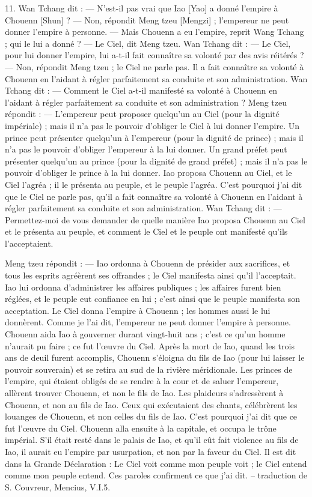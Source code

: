 \begin{singlequote}
  11.	Wan Tchang dit :
—	N’est-il pas vrai que Iao [Yao] a donné l’empire à Chouenn [Shun] ?
—	Non, répondit Meng tzeu [Mengzi] ; l’empereur ne peut donner l’empire à personne.
—	Mais Chouenn a eu l’empire, reprit Wang Tchang ; qui le lui a donné ?
—	Le Ciel, dit Meng tzeu. Wan Tchang dit :
—	Le Ciel, pour lui donner l’empire, lui a-t-il fait connaître sa volonté par des avis réitérés ?
—	Non, répondit Meng tzeu ; le Ciel ne parle pas. Il a fait connaître sa volonté à Chouenn en l’aidant à régler parfaitement sa conduite et son administration.
Wan Tchang dit :
—	Comment le Ciel a-t-il manifesté sa volonté à Chouenn en l’aidant à régler parfaitement sa conduite et son administration ?
Meng tzeu répondit :
—	L’empereur peut proposer quelqu’un au Ciel (pour la dignité impériale) ; mais il n’a pas le pouvoir d’obliger le Ciel à lui donner l’empire. Un prince peut présenter quelqu’un à l’empereur (pour la dignité de prince) ; mais il n’a pas le pouvoir d’obliger l’empereur à la lui donner. Un grand préfet peut présenter quelqu’un au prince (pour la dignité de grand préfet) ; mais il n’a pas le pouvoir d’obliger le prince à la lui donner. Iao proposa Chouenn au Ciel, et le Ciel l’agréa ; il le présenta au peuple, et le peuple l’agréa. C’est pourquoi j’ai dit que le Ciel ne parle pas, qu’il a fait connaître sa volonté à Chouenn en l’aidant à régler parfaitement sa conduite et son administration.
Wan Tchang dit :
—	Permettez-moi de vous demander de quelle manière Iao proposa Chouenn au Ciel et le présenta au peuple, et comment le Ciel et le peuple ont manifesté qu’ils l’acceptaient.
 
Meng tzeu répondit :
—	Iao ordonna à Chouenn de présider aux sacrifices, et tous les esprits agréèrent ses offrandes ; le Ciel manifesta ainsi qu’il l’acceptait. Iao lui ordonna d’administrer les affaires publiques ; les affaires furent bien réglées, et le peuple eut confiance en lui ; c’est ainsi que le peuple manifesta son acceptation. Le Ciel donna l’empire à Chouenn ; les hommes aussi le lui donnèrent. Comme je l’ai dit, l’empereur ne peut donner l’empire à personne.
Chouenn aida Iao à gouverner durant vingt-huit ans ; c’est ce qu’un homme n’aurait pu faire ; ce fut l’œuvre du Ciel. Après la mort de Iao, quand les trois ans de deuil furent accomplis, Chouenn s’éloigna du fils de Iao (pour lui laisser le pouvoir souverain) et se retira au sud de la rivière méridionale. Les princes de l’empire, qui étaient obligés de se rendre à la cour et de saluer l’empereur, allèrent trouver Chouenn, et non le fils de Iao. Les plaideurs s’adressèrent à Chouenn, et non au fils de Iao. Ceux qui exécutaient des chants, célébrèrent les louanges de Chouenn, et non celles du fils de Iao. C’est pourquoi j’ai dit que ce fut l’œuvre du Ciel. Chouenn alla ensuite à la capitale, et occupa le trône impérial. S’il était resté dans le palais de Iao, et qu’il eût fait violence au fils de Iao, il aurait eu l’empire par usurpation, et non par la faveur du Ciel. Il est dit dans la Grande Déclaration :
Le Ciel voit comme mon peuple voit ; le Ciel entend comme mon peuple entend.
Ces paroles confirment ce que j’ai dit.
-- traduction de S. Couvreur, Mencius, V.I.5.
  

\end{singlequote}
